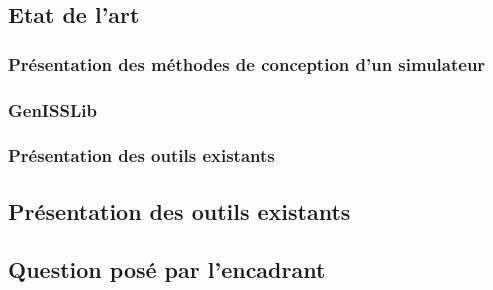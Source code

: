 \subsection{Etat de l'art}

\subsubsection{Présentation des méthodes de conception d'un simulateur}
\subsubsection{GenISSLib}
\subsubsection{Présentation des outils existants}

\subsection{Présentation des outils existants}

\subsection{Question posé par l'encadrant}